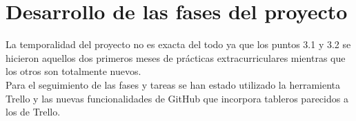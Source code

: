 \chapter{Desarrollo de las fases del proyecto}
\graphicspath{{imagenes/estructura_y_desarrollo/}}

La temporalidad del proyecto no es exacta del todo ya que los puntos 3.1 y 3.2 se hicieron aquellos dos primeros meses de prácticas extracurriculares mientras que los otros son totalmente nuevos. 
\\Para el seguimiento de las fases y tareas se han estado utilizado la herramienta Trello y las nuevas funcionalidades de GitHub que incorpora tableros parecidos a los de Trello.







